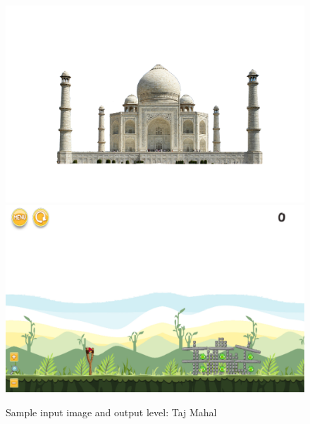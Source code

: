\documentclass{dalthesis}
\begin{document}
\begin{figure}
	\caption{Sample input image and output level: Taj Mahal}
  \includegraphics[width=\textwidth,height=\textheight,keepaspectratio]{levels/pictures/buildings/taj_mahal.jpg}
  \includegraphics[width=\textwidth,height=\textheight,keepaspectratio]{levels/screenshots/buildings/taj_mahal.png}
\end{figure}
\end{document}
